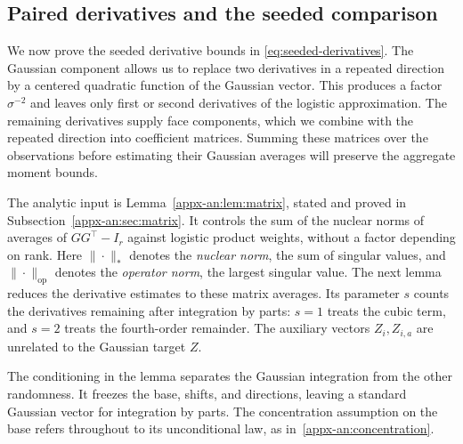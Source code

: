 \documentclass[11pt,letterpaper,twoside,leqno]{article}
\theoremstyle{bookplain}
\theoremstyle{bookremark}
\newcommand{\op}{\mathrm{op}}
\begin{document}
\subsection{Paired derivatives and the seeded comparison}
\label{appx-an:sec:restoration}

We now prove the seeded derivative bounds in
\eqref{eq:seeded-derivatives}. The Gaussian component allows us to
replace two derivatives in a repeated direction by a centered
quadratic function of the Gaussian vector. This produces a factor
$\sigma^{-2}$ and leaves only first or second derivatives of the
logistic approximation. The remaining derivatives supply face
components, which we combine with the repeated direction into
coefficient matrices. Summing these matrices over the observations
before estimating their Gaussian averages will preserve the
aggregate moment bounds.

The analytic input is Lemma~\ref{appx-an:lem:matrix}, stated and
proved in Subsection~\ref{appx-an:sec:matrix}. It controls the sum of
the nuclear norms of averages of $GG^\top-I_r$ against
logistic product weights, without a factor depending on rank.
Here $\|\cdot\|_*$ denotes the \emph{nuclear norm}, the sum of
singular values, and $\|\cdot\|_{\op}$ denotes the
\emph{operator norm}, the largest singular value. The next lemma
reduces the derivative estimates to these matrix averages. Its
parameter $s$ counts the derivatives remaining after integration
by parts: $s=1$ treats the cubic term, and $s=2$ treats the
fourth-order remainder. The auxiliary vectors $Z_i,Z_{i,a}$ are
unrelated to the Gaussian target $Z$.

The conditioning in the lemma separates the Gaussian integration
from the other randomness. It freezes the base, shifts, and
directions, leaving a standard Gaussian vector for integration by
parts. The concentration assumption on the base refers throughout
to its unconditional law, as in~\eqref{appx-an:concentration}.
\end{document}
